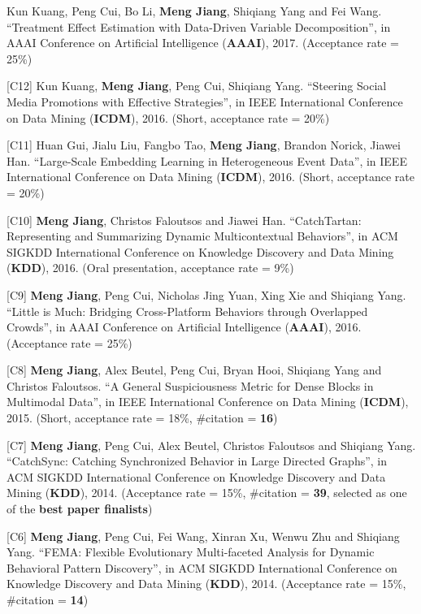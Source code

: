 \documentclass[margin, 10pt]{res}
\begin{document}
\begin{resume}
[C13] Kun Kuang, Peng Cui, Bo Li, \textbf{Meng Jiang}, Shiqiang Yang and Fei Wang. ``Treatment Effect Estimation with Data-Driven Variable Decomposition'', in AAAI Conference on Artificial Intelligence (\textbf{AAAI}), 2017. (Acceptance rate = 25\%)

[C12] Kun Kuang, \textbf{Meng Jiang}, Peng Cui, Shiqiang Yang. ``Steering Social Media Promotions with Effective Strategies'', in IEEE International Conference on Data Mining (\textbf{ICDM}), 2016. (Short, acceptance rate = 20\%)

[C11] Huan Gui, Jialu Liu, Fangbo Tao, \textbf{Meng Jiang}, Brandon Norick, Jiawei Han. ``Large-Scale Embedding Learning in Heterogeneous Event Data'', in IEEE International Conference on Data Mining (\textbf{ICDM}), 2016. (Short, acceptance rate = 20\%)

[C10] \textbf{Meng Jiang}, Christos Faloutsos and Jiawei Han. ``CatchTartan: Representing and Summarizing Dynamic Multicontextual Behaviors'', in ACM SIGKDD International Conference on Knowledge Discovery and Data Mining (\textbf{KDD}), 2016. (Oral presentation, acceptance rate = 9\%)

[C9] \textbf{Meng Jiang}, Peng Cui, Nicholas Jing Yuan, Xing Xie and Shiqiang Yang. ``Little is Much: Bridging Cross-Platform Behaviors through Overlapped Crowds'', in AAAI Conference on Artificial Intelligence (\textbf{AAAI}), 2016. (Acceptance rate = 25\%)

[C8] \textbf{Meng Jiang}, Alex Beutel, Peng Cui, Bryan Hooi, Shiqiang Yang and Christos Faloutsos. ``A General Suspiciousness Metric for Dense Blocks in Multimodal Data'', in IEEE International Conference on Data Mining (\textbf{ICDM}), 2015. (Short, acceptance rate = 18\%, \#citation = \textbf{16})

[C7] \textbf{Meng Jiang}, Peng Cui, Alex Beutel, Christos Faloutsos and Shiqiang Yang. ``CatchSync: Catching Synchronized Behavior in Large Directed Graphs'', in ACM SIGKDD International Conference on Knowledge Discovery and Data Mining (\textbf{KDD}), 2014. (Acceptance rate = 15\%, \#citation = \textbf{39}, selected as one of the \textbf{best paper finalists})

[C6] \textbf{Meng Jiang}, Peng Cui, Fei Wang, Xinran Xu, Wenwu Zhu and Shiqiang Yang. ``FEMA: Flexible Evolutionary Multi-faceted Analysis for Dynamic Behavioral Pattern Discovery'', in ACM SIGKDD International Conference on Knowledge Discovery and Data Mining (\textbf{KDD}), 2014. (Acceptance rate = 15\%, \#citation = \textbf{14})


\end{resume}
\end{document}
